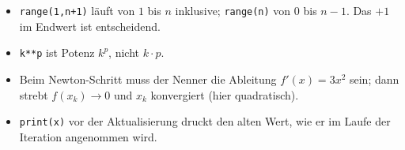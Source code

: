 \begin{achtung}
\begin{itemize}
  \item \texttt{range(1,n+1)} läuft von $1$ bis $n$ inklusive;
        \texttt{range(n)} von $0$ bis $n-1$. Das \emph{$+1$} im Endwert ist
        entscheidend.
  \item \texttt{k**p} ist Potenz $k^p$, nicht $k\cdot p$.
  \item Beim Newton-Schritt muss der Nenner die Ableitung $f'(x)=3x^2$
        sein; dann strebt $f(x_k)\to0$ und $x_k$ konvergiert (hier
        quadratisch).
  \item \texttt{print(x)} vor der Aktualisierung druckt den alten Wert,
        wie er im Laufe der Iteration angenommen wird.
\end{itemize}
\end{achtung}
